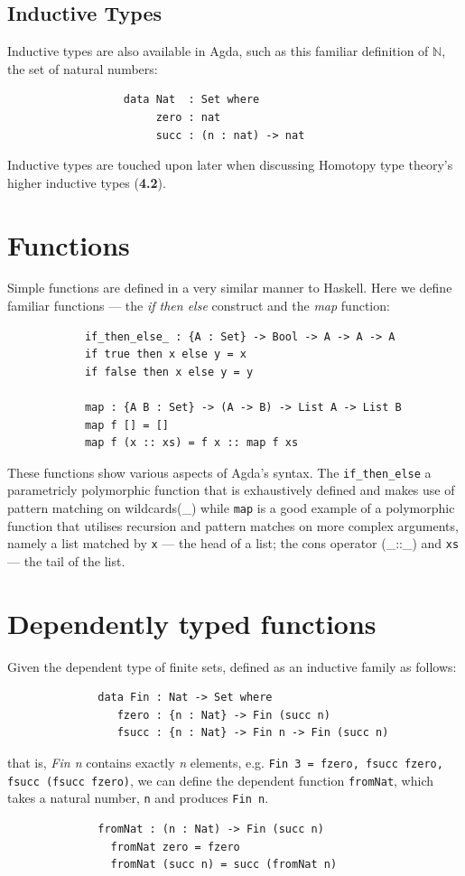 \documentclass[12pt]{report}
\begin{document}
\subsection{Inductive Types}
Inductive types are also available in Agda, such as this familiar definition of $\mathbb{N}$, the set of natural numbers:
\begin{verbatim}
                  data Nat  : Set where
                       zero : nat
                       succ : (n : nat) -> nat
\end{verbatim}
Inductive types are touched upon later when discussing Homotopy type theory's higher inductive types (\textbf{4.2}).

\section{Functions}
Simple functions are defined in a very similar manner to Haskell. Here we define familiar functions --- the \textit{if then else} construct and the \textit{map} function: 
\begin{verbatim}
            if_then_else_ : {A : Set} -> Bool -> A -> A -> A
            if true then x else y = x  
            if false then x else y = y
                        
            map : {A B : Set} -> (A -> B) -> List A -> List B
            map f [] = []
            map f (x :: xs) = f x :: map f xs        
\end{verbatim}
These functions show various aspects of Agda's syntax. The \texttt{if\_then\_else} a parametricly polymorphic function that  is exhaustively defined and makes use of pattern matching on wildcards(\_) while \texttt{map} is a good example of a polymorphic function that utilises recursion and pattern matches on more complex arguments, namely a list matched by \texttt{x} --- the head of a list; the cons operator (\_::\_) and \texttt{xs} --- the tail of the list.

\section{Dependently typed functions}
Given the dependent type of finite sets, defined as an inductive family as follows:
\begin{verbatim}
              data Fin : Nat -> Set where
                 fzero : {n : Nat} -> Fin (succ n)
                 fsucc : {n : Nat} -> Fin n -> Fin (succ n)
\end{verbatim}
that is, \textit{Fin n} contains exactly \textit{n} elements, e.g. \texttt{Fin 3 = fzero, fsucc fzero, fsucc (fsucc fzero)}, we can define the dependent function \texttt{fromNat}, which takes a natural number, \texttt{n} and produces \texttt{Fin n}.
\begin{verbatim}
              fromNat : (n : Nat) -> Fin (succ n)
                fromNat zero = fzero  
                fromNat (succ n) = succ (fromNat n)
\end{verbatim}
\end{document}
